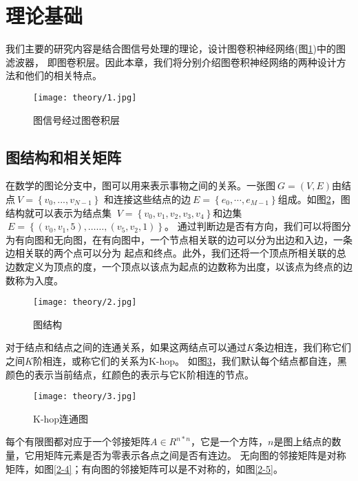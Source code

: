 \cleardoublepage

\section{理论基础}
我们主要的研究内容是结合图信号处理的理论，设计图卷积神经网络(图\ref{2-1})中的图滤波器，
即图卷积层。因此本章，我们将分别介绍图卷积神经网络的两种设计方法和他们的相关特点。

\begin{figure}[ht]
    \centering
    \texttt{[image: theory/1.jpg]}
    \caption{\label{2-1}图信号经过图卷积层}
\end{figure}

\subsection{图结构和相关矩阵}
在数学的图论分支中，图可以用来表示事物之间的关系。一张图$\ G = (V , E) $由结点$\ V = \left \{ v_{0}, ... ,v_{N-1} \right \} $
和连接这些结点的边$\ E = \left \{ e_{0}, \cdots ,e_{M-1} \right \} $组成。如图\ref{2-2}，图结构就可以表示为结点集
$\ V = \left \{ v_{0}, v_{1},v_{2},v_{3},v_{4} \right \} $和边集$\ E = \left \{ (v_0,v_1,5), …… ,(v_5,v_2,1) \right \} $。
通过判断边是否有方向，我们可以将图分为有向图和无向图，在有向图中，一个节点相关联的边可以分为出边和入边，一条边相关联的两个点可以分为
起点和终点。此外，我们还将一个顶点所相关联的总边数定义为顶点的度，一个顶点以该点为起点的边数称为出度，以该点为终点的边数称为入度。
\begin{figure}[ht]
    \centering
    \texttt{[image: theory/2.jpg]}
    \caption{\label{2-2}图结构}
\end{figure}

对于结点和结点之间的连通关系，如果这两结点可以通过$K$条边相连，我们称它们之间$K$阶相连，或称它们的关系为K-hop。
如图\ref{2-3}，我们默认每个结点都自连，黑颜色的表示当前结点，红颜色的表示与它K阶相连的节点。
\begin{figure}[ht]
    \centering
    \texttt{[image: theory/3.jpg]}
    \caption{\label{2-3}K-hop连通图}
\end{figure}

每个有限图都对应于一个邻接矩阵$A \in R^{n*n}$，它是一个方阵，$n$是图上结点的数量，它用矩阵元素是否为零表示各点之间是否有连边。
无向图的邻接矩阵是对称矩阵，如图\ref{2-4}；有向图的邻接矩阵可以是不对称的，如图\ref{2-5}。

